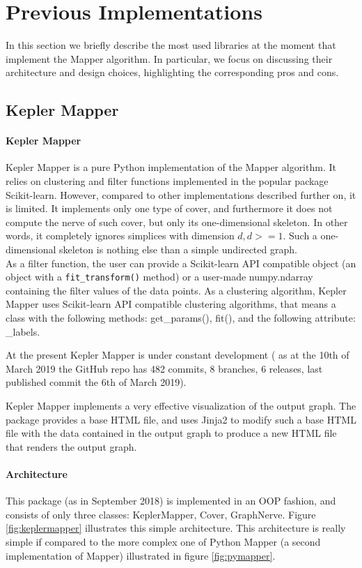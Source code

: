 \section{Previous Implementations}
In this section we briefly describe the most used libraries at the moment that implement the Mapper algorithm. In particular, we focus on discussing their architecture and design choices, highlighting the corresponding pros and cons.


\subsection{Kepler Mapper}
\paragraph{Kepler Mapper}
Kepler Mapper is a pure Python implementation of the Mapper algorithm. It relies on clustering and filter functions implemented in the popular package Scikit-learn. However, compared to other implementations described further on, it is limited. It implements only one type of cover, and furthermore it does not compute the nerve of such cover, but only its one-dimensional skeleton. In other words, it completely ignores simplices with dimension $d, d>=1$. Such a one-dimensional skeleton is nothing else than a simple undirected graph.\\
As a filter function, the user can provide a Scikit-learn API compatible object (an object with a \lstinline|fit_transform()| method) or a user-made numpy.ndarray containing the filter values of the data points. As a clustering algorithm, Kepler Mapper uses Scikit-learn API compatible clustering algorithms, that means a class with the following methods: get\_params(), fit(), and the following attribute: \_labels.

At the present Kepler Mapper is under constant development ( as at the 10th of March 2019 the GitHub repo has 482 commits, 8 branches, 6 releases, last published commit the 6th of March 2019).

Kepler Mapper implements a very effective visualization of the output graph. The package provides a base HTML file, and uses Jinja2 to modify such a base HTML file with the data contained in the output graph to produce a new HTML file that renders the output graph.
\paragraph{Architecture}
This package (as in September 2018) is implemented in an OOP fashion, and consists of only three classes: KeplerMapper, Cover, GraphNerve. Figure \ref{fig:keplermapper} illustrates this simple architecture. This architecture is really simple if compared to the more complex one of Python Mapper (a second implementation of Mapper) illustrated in figure \ref{fig:pymapper}.
